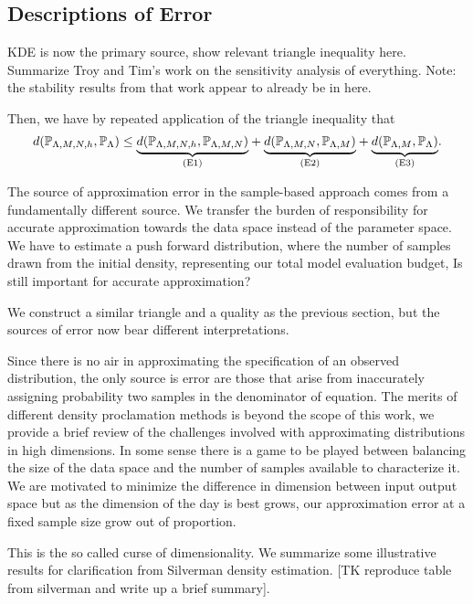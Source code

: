 \subsection{Descriptions of Error}\label{sec:sample-error}

KDE is now the primary source, show relevant triangle inequality here.
Summarize Troy and Tim's work on the sensitivity analysis of everything.
Note: the stability results from that work appear to already be in here.

Then, we have by repeated application of the triangle inequality that
\begin{equation}
\label{eq:sample-triangleineq}
d(\mathbb{P}_{{\Lambda}, M, N, h}, \mathbb{P}_{\Lambda}) \leq
\underset{ \text{(E1)} }{\underbrace{d(\mathbb{P}_{{\Lambda}, M, N, h},\mathbb{P}_{{\Lambda}, M, N})}} +
\underset{ \text{(E2)} }{\underbrace{d(\mathbb{P}_{{\Lambda}, M, N}, \mathbb{P}_{{\Lambda}, M}) }}+
\underset{ \text{(E3)} }{\underbrace{d(\mathbb{P}_{{\Lambda}, M}, \mathbb{P}_{\Lambda}) }}.
\end{equation}

The source of approximation error in the sample-based approach comes from a fundamentally different source.
We transfer the burden of responsibility for accurate approximation towards the data space instead of the parameter space.
We have to estimate a push forward distribution, where the number of samples drawn from the initial density, representing our total model evaluation budget,
Is still important for accurate approximation?

We construct a similar triangle and a quality as the previous section, but the sources of error now bear different interpretations.

Since there is no air in approximating the specification of an observed distribution, the only source is error are those that arise from inaccurately assigning probability two samples in the denominator of equation.
The merits of different density proclamation methods is beyond the scope of this work, we provide a brief review of the challenges involved with approximating distributions in high dimensions.
In some sense there is a game to be played between balancing the size of the data space and the number of samples available to characterize it.
We are motivated to minimize the difference in dimension between input output space but as the dimension of the day is best grows, our approximation error at a fixed sample size grow out of proportion.

This is the so called curse of dimensionality.
We summarize some illustrative results for clarification from Silverman density estimation.
[TK reproduce table from silverman and write up a brief summary].
